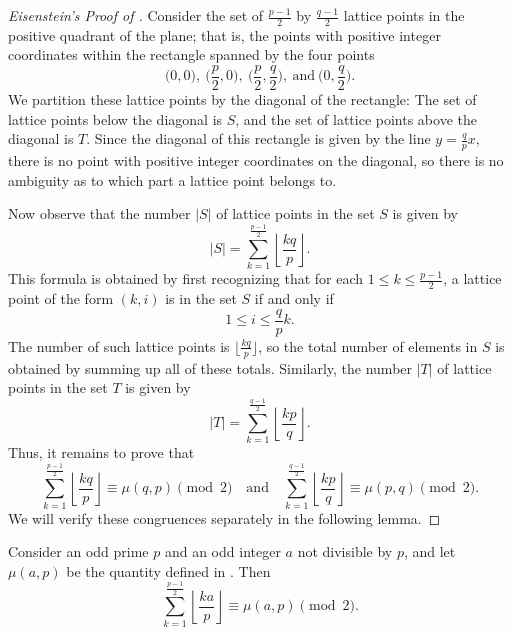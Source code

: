 \begin{proof}[Eisenstein's Proof of ]
  Consider the set of $\frac{p-1}{2}$ by $\frac{q-1}{2}$ lattice points in the positive quadrant of the plane; that is, the points with positive integer coordinates within the rectangle spanned by the four points
  \begin{equation*}
    {\textstyle \bigl(0,0\bigr),~\bigl(\frac{p}{2},0\bigr),~\bigl(\frac{p}{2},\frac{q}{2}\bigr),~\text{and}~\bigl(0,\frac{q}{2}\bigr)}.
  \end{equation*}
  We partition these lattice points by the diagonal of the rectangle: The set of lattice points below the diagonal is $S$, and the set of lattice points above the diagonal is $T$. Since the diagonal of this rectangle is given by the line $y=\frac{q}{p}x$, there is no point with positive integer coordinates on the diagonal, so there is no ambiguity as to which part a lattice point belongs to.

  Now observe that the number $|S|$ of lattice points in the set $S$ is given by
  \begin{equation*}
    |S|= \sum_{k=1}^{\frac{p-1}{2}}\left\lfloor\frac{kq}{p}\right\rfloor.
  \end{equation*}
  This formula is obtained by first recognizing that for each $1\leq k\leq\frac{p-1}{2}$, a lattice point of the form $(k,i)$ is in the set $S$ if and only if
  \begin{equation*}
    1\leq i \leq \frac{q}{p}k.
  \end{equation*}
  The number of such lattice points is $\bigl\lfloor\frac{kq}{p}\bigr\rfloor$, so the total number of elements in $S$ is obtained by summing up all of these totals. Similarly, the number $|T|$ of lattice points in the set $T$ is given by
  \begin{equation*}
    |T|= \sum_{k=1}^{\frac{q-1}{2}}\left\lfloor\frac{kp}{q}\right\rfloor.
  \end{equation*}
  Thus, it remains to prove that
  \begin{equation*}
    \sum_{k=1}^{\frac{p-1}{2}}\left\lfloor\frac{kq}{p}\right\rfloor\equiv \mu(q,p)\pmod{2}\quad\text{and}\quad \sum_{k=1}^{\frac{q-1}{2}}\left\lfloor\frac{kp}{q}\right\rfloor\equiv\mu(p,q)\pmod{2}.
  \end{equation*}
  We will verify these congruences separately in the following lemma.
\end{proof}

\begin{lemma}
  Consider an odd prime $p$ and an odd integer $a$ not divisible by $p$, and let $\mu(a,p)$ be the quantity defined in . Then
  \begin{equation*}
    \sum_{k=1}^{\frac{p-1}{2}}\left\lfloor\frac{ka}{p}\right\rfloor \equiv \mu(a,p)\pmod{2}.
  \end{equation*}
\end{lemma}

